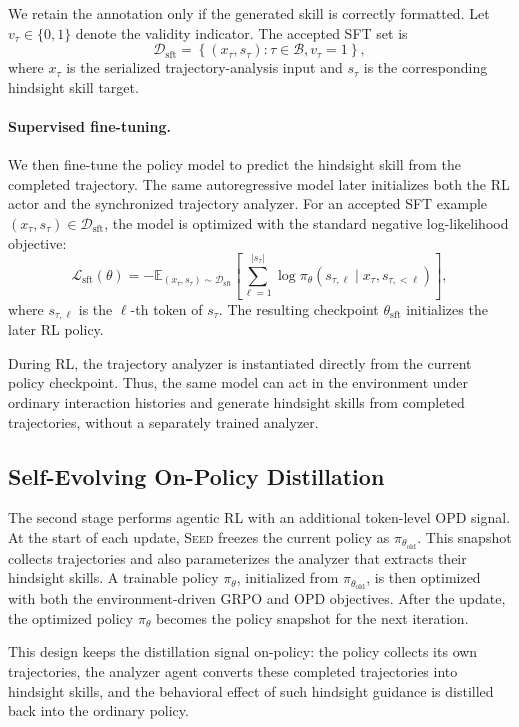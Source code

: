 We retain the annotation only if the generated skill is correctly formatted. Let $v_\tau \in \{0,1\}$ denote the validity indicator. The accepted SFT set is
\[
\mathcal{D}_{\mathrm{sft}}
=
\left\{
(x_\tau, s_\tau)
:
\tau \in \mathcal{B},
v_\tau = 1
\right\},
\]
where $x_\tau$ is the serialized trajectory-analysis input and $s_\tau$ is the corresponding hindsight skill target.

\paragraph{Supervised fine-tuning.}
We then fine-tune the policy model to predict the hindsight skill from the completed trajectory. The same autoregressive model later initializes both the RL actor and the synchronized trajectory analyzer. For an accepted SFT example $(x_\tau, s_\tau) \in \mathcal{D}_{\mathrm{sft}}$, the model is optimized with the standard negative log-likelihood objective:
\[
\mathcal{L}_{\mathrm{sft}}(\theta)
=
-
\mathbb{E}_{(x_\tau,s_\tau)\sim\mathcal{D}_{\mathrm{sft}}}
\left[
\sum_{\ell=1}^{|s_\tau|}
\log \pi_\theta\!\left(
s_{\tau,\ell}
\mid
x_\tau, s_{\tau,<\ell}
\right)
\right],
\]
where $s_{\tau,\ell}$ is the $\ell$-th token of $s_\tau$. The resulting checkpoint $\theta_{\mathrm{sft}}$ initializes the later RL policy.

During RL, the trajectory analyzer is instantiated directly from the current policy checkpoint. Thus, the same model can act in the environment under ordinary interaction histories and generate hindsight skills from completed trajectories, without a separately trained analyzer.

\subsection{Self-Evolving On-Policy Distillation}
The second stage performs agentic RL with an additional token-level OPD signal. At the start of each update, \textsc{Seed} freezes the current policy as $\pi_{\theta_{\mathrm{old}}}$. This snapshot collects trajectories and also parameterizes the analyzer that extracts their hindsight skills. A trainable policy $\pi_\theta$, initialized from $\pi_{\theta_{\mathrm{old}}}$, is then optimized with both the environment-driven GRPO and OPD objectives. After the update, the optimized policy $\pi_\theta$ becomes the policy snapshot for the next iteration.

This design keeps the distillation signal on-policy: the policy collects its own trajectories, the analyzer agent converts these completed trajectories into hindsight skills, and the behavioral effect of such hindsight guidance is distilled back into the ordinary policy.

